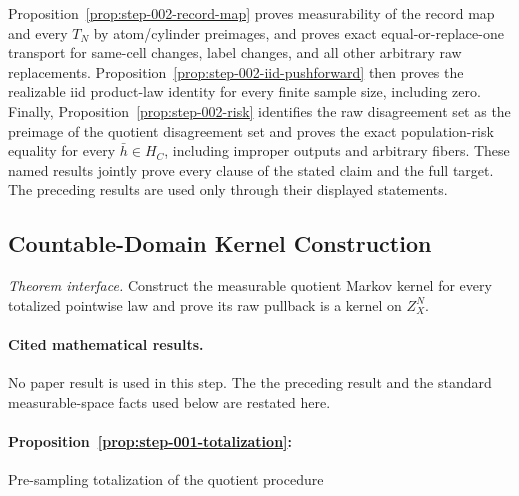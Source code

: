 Proposition~\ref{prop:step-002-record-map} proves measurability of the record
map and every \(T_N\) by atom/cylinder preimages, and proves exact
equal-or-replace-one transport for same-cell changes, label changes, and all
other arbitrary raw replacements. Proposition~\ref{prop:step-002-iid-pushforward}
then proves the realizable iid product-law identity for every finite sample
size, including zero. Finally, Proposition~\ref{prop:step-002-risk} identifies
the raw disagreement set as the preimage of the quotient disagreement set
and proves the exact population-risk equality for every \(\bar h\in H_C\),
including improper outputs and arbitrary fibers. These named results jointly
prove every clause of the stated claim and the full target. The preceding results are used only through their displayed statements.



\subsection{Countable-Domain Kernel Construction}\label{app:step_003}

\noindent\textit{Theorem interface.} Construct the measurable quotient Markov kernel for every   totalized pointwise law and prove its raw pullback is a kernel on   \(Z_X^N\).

\paragraph{Cited mathematical results.}


No paper result is used in this step. The the preceding result and
the standard measurable-space facts used below are restated here.

\paragraph{Proposition~\ref{prop:step-001-totalization}:}
Pre-sampling totalization of the quotient procedure

